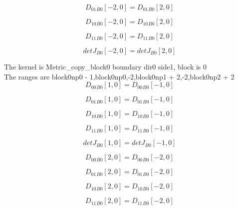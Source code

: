 \documentclass{article}
\begin{document}
\begin{dmath}{D_{01}{_{B0}}}[{-2,0}] = {D_{01}{_{B0}}}[{2,0}]\end{dmath}

\begin{dmath}{D_{10}{_{B0}}}[{-2,0}] = {D_{10}{_{B0}}}[{2,0}]\end{dmath}

\begin{dmath}{D_{11}{_{B0}}}[{-2,0}] = {D_{11}{_{B0}}}[{2,0}]\end{dmath}

\begin{dmath}{detJ{_{B0}}}[{-2,0}] = {detJ{_{B0}}}[{2,0}]\end{dmath}

\noindent The kernel is Metric_copy_block0 boundary dir0 side1, block is 0\\\noindent The ranges are block0np0 - 1,block0np0,-2,block0np1 + 2,-2,block0np2 + 2\\\begin{dmath}{D_{00}{_{B0}}}[{1,0}] = {D_{00}{_{B0}}}[{-1,0}]\end{dmath}

\begin{dmath}{D_{01}{_{B0}}}[{1,0}] = {D_{01}{_{B0}}}[{-1,0}]\end{dmath}

\begin{dmath}{D_{10}{_{B0}}}[{1,0}] = {D_{10}{_{B0}}}[{-1,0}]\end{dmath}

\begin{dmath}{D_{11}{_{B0}}}[{1,0}] = {D_{11}{_{B0}}}[{-1,0}]\end{dmath}

\begin{dmath}{detJ{_{B0}}}[{1,0}] = {detJ{_{B0}}}[{-1,0}]\end{dmath}

\begin{dmath}{D_{00}{_{B0}}}[{2,0}] = {D_{00}{_{B0}}}[{-2,0}]\end{dmath}

\begin{dmath}{D_{01}{_{B0}}}[{2,0}] = {D_{01}{_{B0}}}[{-2,0}]\end{dmath}

\begin{dmath}{D_{10}{_{B0}}}[{2,0}] = {D_{10}{_{B0}}}[{-2,0}]\end{dmath}

\begin{dmath}{D_{11}{_{B0}}}[{2,0}] = {D_{11}{_{B0}}}[{-2,0}]\end{dmath}
\end{document}
